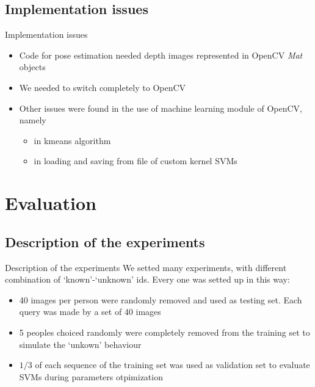 \documentclass{beamer}
\begin{document}
\subsection{Implementation issues}
\begin{frame}{Implementation issues}
	\begin{itemize}
		\item Code for pose estimation needed depth images represented
			in OpenCV \textit{Mat} objects
		\item We needed to switch completely to OpenCV
		\item Other issues were found in the use of machine learning
			module of OpenCV, namely
			\begin{itemize}
				\item in kmeans algorithm
				\item in loading and saving from file of custom
					kernel SVMs
			\end{itemize}
	\end{itemize}
\end{frame}

\section{Evaluation}
\subsection{Description of the experiments}
\begin{frame}{Description of the experiments}
	We setted many experiments, with different combination of
	`known'-`unknown' ids. Every one was setted up in this way:
	\begin{itemize}
		\item 40 images per person were randomly removed and used as
			testing set. Each query was made by a set of 40 images
		\item 5 peoples choiced randomly were completely removed from
			the training set to simulate the `unkown' behaviour
		\item $1/3$ of each sequence of the training set was used as
			validation set to evaluate SVMs during parameters
			otpimization
	\end{itemize}
\end{frame}
\end{document}
